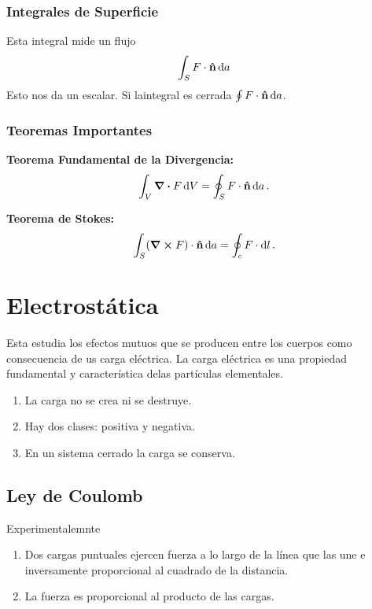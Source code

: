 \subsection{Integrales de Superficie}
Esta integral mide un flujo
\begin{equation}
	\int _S F\cdot \vu{n} \dd{a}
\end{equation}
Esto nos da un escalar. Si laintegral es cerrada $\oint F\cdot \vu{n} \dd{a}$.

\subsection{Teoremas Importantes}
\begin{teorema}
	\textbf{Teorema Fundamental de la Divergencia: }
	\begin{equation}
		\int _V \div{F} \dd{V} = \oint _S F\cdot \vu{n} \dd{a}.
	\end{equation}
\end{teorema}


\begin{teorema}
	\textbf{Teorema de Stokes: }
	\begin{equation}
		\int _S (\curl{F}) \cdot \vu{n} \dd{a} = \oint _c F \cdot \dd{l}.
	\end{equation}
\end{teorema}




\chapter{Electrostática}
Esta estudia los efectos mutuos que se producen entre los cuerpos como consecuencia de us carga eléctrica. La carga eléctrica es una propiedad fundamental y característica delas partículas elementales.
\begin{enumerate}
	\item La carga no se crea ni se destruye.
	\item Hay dos clases: positiva y negativa.
	\item En un sistema cerrado la carga se conserva.
\end{enumerate}

\section{Ley de Coulomb}
Experimentalemnte
\begin{enumerate}
	\item Dos cargas puntuales ejercen fuerza a lo largo de la línea que las une e inversamente proporcional al cuadrado de la distancia.
	\item La fuerza es proporcional al producto de las cargas.
\end{enumerate}

